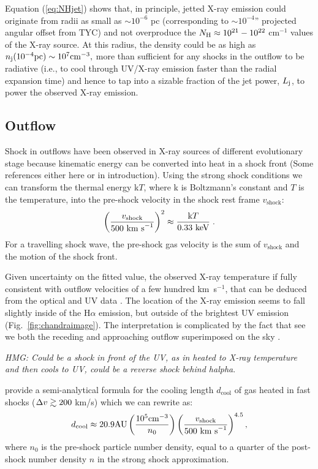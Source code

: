 \documentclass[linenumbers]{aastex631}
\begin{document}
Equation (\ref{eq:NHjet}) shows that, in principle, jetted X-ray emission could originate from radii as small as $\sim 10^{-6}$ pc (corresponding to $\sim 10^{-4}$'' projected angular offset from TYC) and not overproduce the $N_{\rm H} \approx 10^{21}-10^{22}$ cm$^{-1}$ values of the X-ray source.  At this radius, the density could be as high as $n_{\rm j}(10^{-4}{\rm pc}) \sim 10^{7}{\rm cm^{-3}},$ more than sufficient for any shocks in the outflow to be radiative (i.e., to cool through UV/X-ray emission faster than the radial expansion time) and hence to tap into a sizable fraction of the jet power, $L_{\rm j}$, to power the observed X-ray emission.



\subsection{Outflow} \label{sec:outflow}
Shock in outflows have been observed in X-ray sources of different evolutionary stage because kinematic energy can be converted into heat in a shock front (Some references either here or in introduction).
Using the strong shock conditions we can transform the thermal energy
k$T$, where k is Boltzmann's constant and $T$ is the temperature, into
the pre-shock velocity in the shock rest frame $v_{\mathrm{shock}}$:
\begin{equation} 
\left(\frac{v_{\mathrm{shock}}}{500\textnormal{ km s}^{-1}}\right)^2 \approx 
\frac{\textnormal{k}T}{0.33\textnormal{ keV}} \; .
\label{vkt} 
\end{equation}
For a travelling shock wave, the pre-shock gas velocity is the sum of $v_{\mathrm{shock}}$ and the motion of the shock front.

Given uncertainty on the fitted value, the observed X-ray temperature if fully consistent with outflow velocities of a few hundred km~s$^{-1}$, that can be deduced from the optical and UV data \citep{2020Natur.587..387H}. The location of the X-ray emission seems to fall slightly inside of the H$\alpha$ emission, but outside of the brightest UV emission (Fig.~\ref{fig:chandraimage}). The interpretation is complicated by the fact that see we both the receding and approaching outflow superimposed on the sky \citep{2020Natur.587..387H}.

\emph{HMG: Could be a shock in front of the UV, as in heated to X-ray temperature and then cools to UV, could be a reverse shock behind halpha}.

\citet{2002ApJ...576L.149R} provide a
semi-analytical formula for the cooling length  %
$d_{\mathrm{cool}}$ of gas
heated in fast shocks ($\Delta v \gtrsim 200$ km/s) which we can rewrite as:
\begin{equation}
d_{\mathrm{cool}} \approx 20.9 \mathrm{ AU} 
    \left(\frac{10^5\mathrm{ cm}^{-3}}{n_0}\right) 
    \left(\frac{v_{\mathrm{shock}}}{500\textnormal{ km s}^{-1}}\right)^{4.5},
\label{raga} 
\end{equation}
where $n_0$ is the pre-shock particle number density, equal to a
quarter of the post-shock number density $n$ in the strong shock
approximation.  
\end{document}
